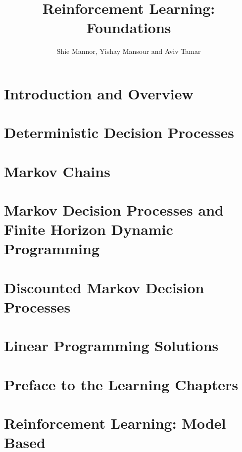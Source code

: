 \documentclass[12pt]{book}
\title{Reinforcement Learning: Foundations}
\date{February 2023
\\
  \textcolor{red}{This book is still work in progress. In particular, references to literature are not complete. We would be grateful for comments, suggestions, omissions, and errors of any kind, at \url{rlfoundationsbook@gmail.com}. }

}
\author{Shie Mannor, Yishay Mansour and Aviv Tamar}
\begin{document}
\maketitle

\tableofcontents



\chapter{Introduction and Overview}
\label{chapter:intro}


\chapter{Deterministic Decision Processes}
\label{chapter:DDP}


\chapter{Markov Chains}
\label{chapter:MC}


\chapter{Markov Decision Processes and Finite Horizon Dynamic Programming}
\label{chapter:MDP-FH}


\chapter{Discounted Markov Decision Processes}
\label{chapter:disc}


\chapter{Linear Programming Solutions}\label{chapter-LP}


\chapter{Preface to the Learning Chapters}\label{chapter-learning-preface}


\chapter{Reinforcement Learning: Model Based}\label{chapter-model-based}

\end{document}
